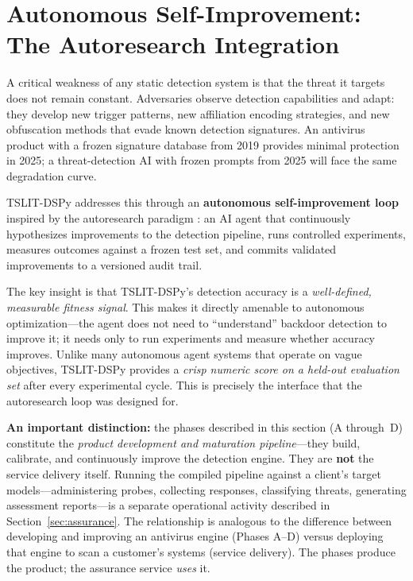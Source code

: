 \documentclass[11pt]{article}
\begin{document}
\section{Autonomous Self-Improvement: The Autoresearch Integration}
\label{sec:autoresearch}

A critical weakness of any static detection system is that the threat
it targets does not remain constant. Adversaries observe detection
capabilities and adapt: they develop new trigger patterns, new affiliation
encoding strategies, and new obfuscation methods that evade known detection
signatures. An antivirus product with a frozen signature database from 2019
provides minimal protection in 2025; a threat-detection AI with frozen
prompts from 2025 will face the same degradation curve.

TSLIT-DSPy addresses this through an \textbf{autonomous self-improvement loop}
inspired by the autoresearch paradigm \cite{karpathy_autoresearch}: an AI
agent that continuously hypothesizes improvements to the detection pipeline,
runs controlled experiments, measures outcomes against a frozen test set,
and commits validated improvements to a versioned audit trail.

The key insight is that TSLIT-DSPy's detection accuracy is a
\emph{well-defined, measurable fitness signal}. This makes it directly
amenable to autonomous optimization---the agent does not need to
``understand'' backdoor detection to improve it; it needs only to run
experiments and measure whether accuracy improves. Unlike many autonomous
agent systems that operate on vague objectives, TSLIT-DSPy provides a
\emph{crisp numeric score on a held-out evaluation set} after every
experimental cycle. This is precisely the interface that the autoresearch
loop was designed for.

\textbf{An important distinction:} the phases described in this section
(A through~D) constitute the \emph{product development and maturation
pipeline}---they build, calibrate, and continuously improve the detection
engine. They are \textbf{not} the service delivery itself. Running the
compiled pipeline against a client's target models---administering probes,
collecting responses, classifying threats, generating assessment
reports---is a separate operational activity described in
Section~\ref{sec:assurance}. The relationship is analogous to the
difference between developing and improving an antivirus engine (Phases
A--D) versus deploying that engine to scan a customer's systems
(service delivery). The phases produce the product; the assurance
service \emph{uses} it.
\end{document}
